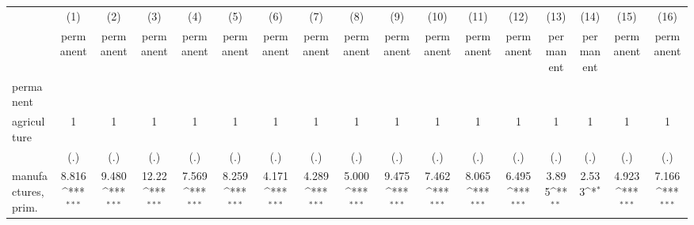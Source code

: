 {
\def\sym#1{\ifmmode^{#1}\else\(^{#1}\)\fi}
\begin{tabular}{l*{16}{c}}
\hline\hline
                    &\multicolumn{1}{c}{(1)}&\multicolumn{1}{c}{(2)}&\multicolumn{1}{c}{(3)}&\multicolumn{1}{c}{(4)}&\multicolumn{1}{c}{(5)}&\multicolumn{1}{c}{(6)}&\multicolumn{1}{c}{(7)}&\multicolumn{1}{c}{(8)}&\multicolumn{1}{c}{(9)}&\multicolumn{1}{c}{(10)}&\multicolumn{1}{c}{(11)}&\multicolumn{1}{c}{(12)}&\multicolumn{1}{c}{(13)}&\multicolumn{1}{c}{(14)}&\multicolumn{1}{c}{(15)}&\multicolumn{1}{c}{(16)}\\
                    &\multicolumn{1}{c}{permanent}&\multicolumn{1}{c}{permanent}&\multicolumn{1}{c}{permanent}&\multicolumn{1}{c}{permanent}&\multicolumn{1}{c}{permanent}&\multicolumn{1}{c}{permanent}&\multicolumn{1}{c}{permanent}&\multicolumn{1}{c}{permanent}&\multicolumn{1}{c}{permanent}&\multicolumn{1}{c}{permanent}&\multicolumn{1}{c}{permanent}&\multicolumn{1}{c}{permanent}&\multicolumn{1}{c}{permanent}&\multicolumn{1}{c}{permanent}&\multicolumn{1}{c}{permanent}&\multicolumn{1}{c}{permanent}\\
\hline
permanent           &                     &                     &                     &                     &                     &                     &                     &                     &                     &                     &                     &                     &                     &                     &                     &                     \\
agriculture         &           1         &           1         &           1         &           1         &           1         &           1         &           1         &           1         &           1         &           1         &           1         &           1         &           1         &           1         &           1         &           1         \\
                    &         (.)         &         (.)         &         (.)         &         (.)         &         (.)         &         (.)         &         (.)         &         (.)         &         (.)         &         (.)         &         (.)         &         (.)         &         (.)         &         (.)         &         (.)         &         (.)         \\
[1em]
manufactures, prim. &       8.816\sym{***}&       9.480\sym{***}&       12.22\sym{***}&       7.569\sym{***}&       8.259\sym{***}&       4.171\sym{***}&       4.289\sym{***}&       5.000\sym{***}&       9.475\sym{***}&       7.462\sym{***}&       8.065\sym{***}&       6.495\sym{***}&       3.895\sym{**} &       2.533\sym{*}  &       4.923\sym{***}&       7.166\sym{***}\\

\end{tabular}}
